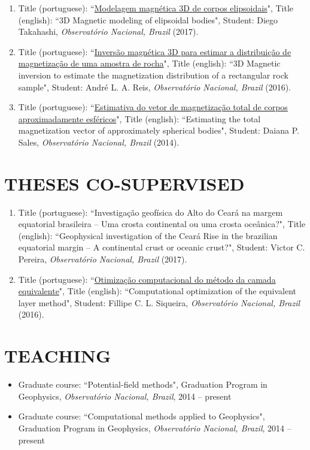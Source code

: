 \documentclass[paper=letter,fontsize=11pt]{scrartcl} %
\newcommand{\sepspace}{\vspace*{1em}}		%
\newcommand{\NewPart}[2]{\section*{\uppercase{#1} #2}}
\newcommand{\ThesisEntry}[6]{
		\noindent [#1] Title (portuguese): ``#2", Title (english): ``#3", Student: #4, \textit{#5} (#6).}
\newcommand{\CourseEntry}[5]{
		\noindent #1 course: ``#2", #3, \textit{#4}, #5}
\begin{document}
\begin{enumerate}

\item\ThesisEntry{MSc}{\href{http://www.pinga-lab.org/thesis/takahashi-msc.html}{Modelagem magn\'{e}tica 3D de corpos elipsoidais}}{3D Magnetic modeling of elipsoidal bodies}{Diego Takahashi}{Observat\'{o}rio Nacional, Brazil}{2017}

\item\ThesisEntry{MSc}{\href{http://www.pinga-lab.org/thesis/andre-msc.html}{Invers\~{a}o magn\'{e}tica 3D para estimar a distribui\c{c}\~{a}o de magnetiza\c{c}\~{a}o de uma amostra de rocha}}{3D Magnetic inversion to estimate the magnetization distribution of a rectangular rock sample}{Andr\'{e} L. A. Reis}{Observat\'{o}rio Nacional, Brazil}{2016}

\item\ThesisEntry{MSc}{\href{http://www.pinga-lab.org/thesis/daiana-msc.html}{Estimativa do vetor de magnetiza\c{c}\~{a}o total de corpos aproximadamente esf\'{e}ricos}}{Estimating the total magnetization vector of approximately spherical bodies}{Daiana P. Sales}{Observat\'{o}rio Nacional, Brazil}{2014}

\end{enumerate}

\sepspace

\NewPart{Theses Co-supervised}{}

\begin{enumerate}

\item\ThesisEntry{MSc}{Investiga\c{c}\~{a}o geof\'{i}sica do Alto do Cear\'{a} na margem equatorial brasileira -- Uma crosta continental ou uma crosta oce\^{a}nica?}{Geophysical investigation of the Cear\'{a} Rise in the brazilian equatorial margin -- A continental crust or oceanic crust?}{Victor C. Pereira}{Observat\'{o}rio Nacional, Brazil}{2017}

\item\ThesisEntry{PhD}{\href{http://www.pinga-lab.org/thesis/siqueira-phd.html}{Otimiza\c{c}\~{a}o computacional do m\'{e}todo da camada equivalente}}{Computational optimization of the equivalent layer method}{Fillipe C. L. Siqueira}{Observat\'{o}rio Nacional, Brazil}{2016}

\end{enumerate}

\sepspace

\NewPart{Teaching}{}

\begin{itemize}

\item\CourseEntry{Graduate}{Potential-field methods}{Graduation Program in Geophysics}{Observat\'{o}rio Nacional, Brazil}{2014 -- present}

\item\CourseEntry{Graduate}{Computational methods applied to Geophysics}{Graduation Program in Geophysics}{Observat\'{o}rio Nacional, Brazil}{2014 -- present}

\end{itemize}
\end{document}
